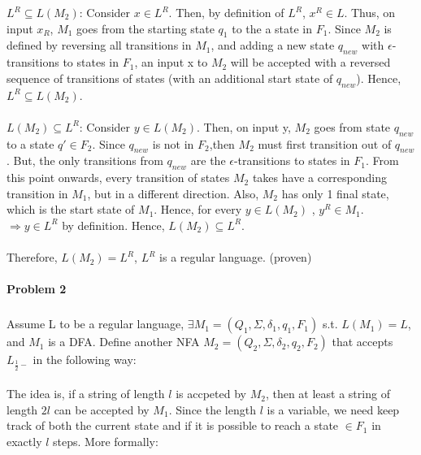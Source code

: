 \documentclass[12pt]{article}
\theoremstyle{definition}
\numberwithin{equation}{section}
\begin{document}
$L^R \subseteq L(M_2)$: Consider $x \in L^R$. Then, by definition of $L^R$, $x^R \in L$. Thus, on input $x_R$, $M_1$ goes from the starting state $q_1$ to the a state in $F_1$. Since $M_2$ is defined by reversing all transitions in $M_1$, and adding a new state $q_{new}$ with $\epsilon$-transitions to states in $F_1$, an input x to $M_2$ will be accepted with a reversed sequence of transitions of states (with an additional start state of $q_{new}$). Hence, $L^R \subseteq L(M_2)$. \\~\\

$L(M_2) \subseteq L^R$: Consider $y \in L(M_2)$. Then, on input y, $M_2$ goes from state $q_{new}$ to a state $q' \in F_2$. Since $q_{new}$ is not in $F_2$,then $M_2$ must first transition out of $q_{new}$. But, the only transitions from $q_{new}$ are the $\epsilon$-transitions to states in $F_1$. From this point onwards, every transition of states $M_2$ takes have a corresponding transition in $M_1$, but in a different direction. Also, $M_2$ has only 1 final state, which is the start state of $M_1$. Hence, for every $y \in L(M_2)$ , $y^R \in M_1$. $\Rightarrow y \in L^R$ by definition. Hence, $L(M_2) \subseteq L^R$. \\~\\

Therefore, $L(M_2) = L^R$, $L^R$ is a regular language. (proven)

\newpage
\paragraph{Problem 2}
\subparagraph{} Assume L to be a regular language,  $\exists M_1 = (Q_1, \Sigma, \delta_1, q_1, F_1)$ s.t. $L(M_1) = L$, and $M_1$ is a DFA. Define another NFA $M_2 = (Q_2, \Sigma, \delta_2, q_2, F_2)$ that accepts $L_{\frac{1}{2}-}$ in the following way: \\~\\

The idea is, if a string of length $l$ is accpeted by $M_2$, then at least a string of length $2l$ can be accepted by $M_1$. Since the length $l$ is a variable, we need keep track of both the current state and if it is possible to reach a state $\in F_1$ in exactly $l$ steps. More formally: \\~\\
\end{document}
